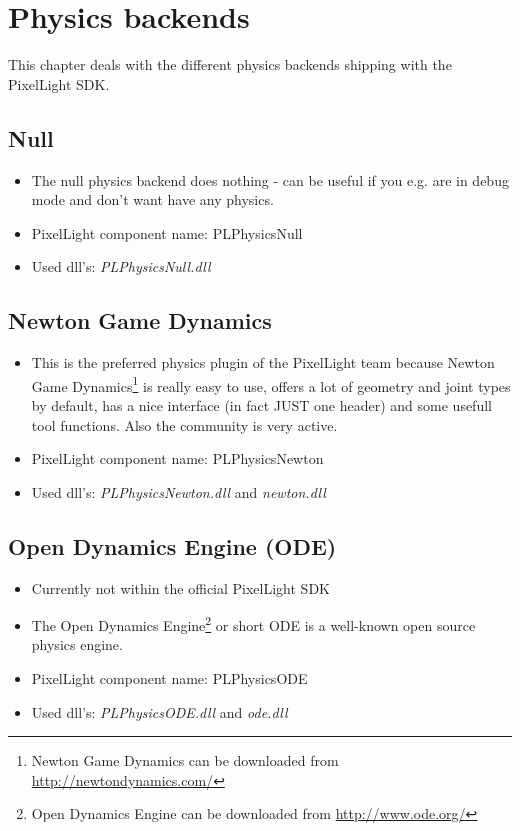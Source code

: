 \chapter{Physics backends}
This chapter deals with the different physics backends shipping with the PixelLight SDK.




\section{Null}
\begin{itemize}
\item The null physics backend does nothing - can be useful if you e.g. are in debug mode and don't want have any physics.
\item PixelLight component name: PLPhysicsNull
\item Used dll's: \emph{PLPhysicsNull.dll}
\end{itemize}




\section{Newton Game Dynamics}
\begin{itemize}
\item This is the preferred physics plugin of the PixelLight team because Newton Game Dynamics\footnote{Newton Game Dynamics can be downloaded from \url{http://newtondynamics.com/}} is really easy to use, offers a lot of geometry and joint types by default, has a nice interface (in fact JUST one header) and some usefull tool functions. Also the community is very active.
\item PixelLight component name: PLPhysicsNewton
\item Used dll's: \emph{PLPhysicsNewton.dll} and \emph{newton.dll}
\end{itemize}




\section{Open Dynamics Engine (ODE)}
\begin{itemize}
\item Currently not within the official PixelLight SDK
\item The Open Dynamics Engine\footnote{Open Dynamics Engine can be downloaded from \url{http://www.ode.org/}} or short ODE is a well-known open source physics engine.
\item PixelLight component name: PLPhysicsODE
\item Used dll's: \emph{PLPhysicsODE.dll} and \emph{ode.dll}
\end{itemize}




